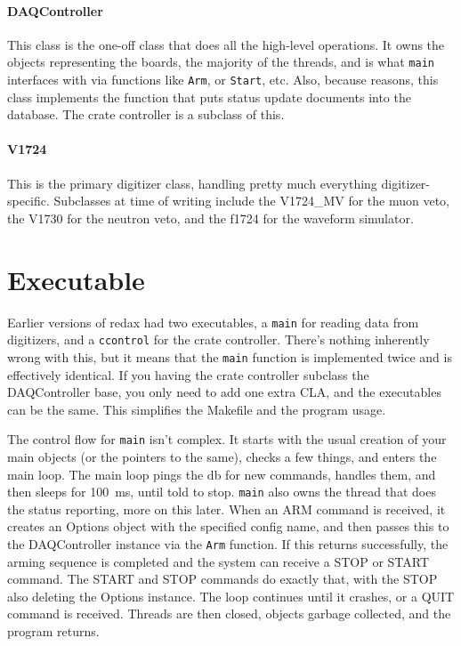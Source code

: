 \paragraph{DAQController}

This class is the one-off class that does all the high-level operations.
It owns the objects representing the boards, the majority of the threads, and is what \texttt{main} interfaces with via functions like \texttt{Arm}, or \texttt{Start}, etc.
Also, because reasons, this class implements the function that puts status update documents into the database.
The crate controller is a subclass of this.

\paragraph{V1724}

This is the primary digitizer class, handling pretty much everything digitizer-specific.
Subclasses at time of writing include the V1724\_MV for the muon veto, the V1730 for the neutron veto, and the f1724 for the waveform simulator.

\section{Executable}

Earlier versions of redax had two executables, a \texttt{main} for reading data from digitizers, and a \texttt{ccontrol} for the crate controller.
There's nothing inherently wrong with this, but it means that the \texttt{main} function is implemented twice and is effectively identical.
If you having the crate controller subclass the DAQController base, you only need to add one extra CLA, and the executables can be the same.
This simplifies the Makefile and the program usage.

The control flow for \texttt{main} isn't complex.
It starts with the usual creation of your main objects (or the pointers to the same), checks a few things, and enters the main loop.
The main loop pings the db for new commands, handles them, and then sleeps for \SI{100}{\milli\second}, until told to stop.
\texttt{main} also owns the thread that does the status reporting, more on this later.
When an ARM command is received, it creates an Options object with the specified config name, and then passes this to the DAQController instance via the \texttt{Arm} function.
If this returns successfully, the arming sequence is completed and the system can receive a STOP or START command.
The START and STOP commands do exactly that, with the STOP also deleting the Options instance.
The loop continues until it crashes, or a QUIT command is received.
Threads are then closed, objects garbage collected, and the program returns.

